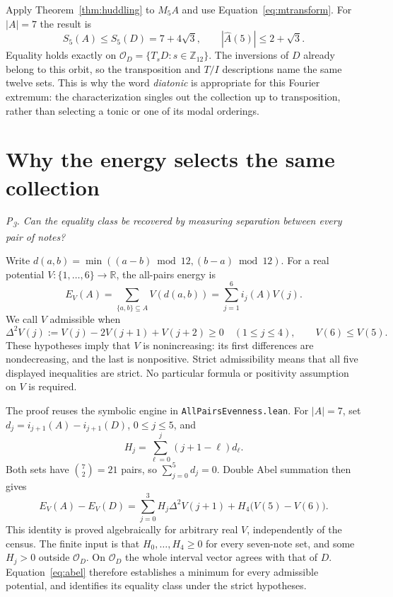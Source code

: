 \documentclass[11pt]{article}
\newcommand{\lean}[1]{\texttt{#1}}
\newcommand{\Ztwelve}{\mathbb{Z}_{12}}
\newcommand{\Ahat}{\widehat A}
\newcommand{\question}[1]{\smallskip\noindent\textit{#1}\smallskip}
\newcommand{\orb}{\mathcal O_D}
\begin{document}
Apply Theorem~\ref{thm:huddling} to $M_5A$ and use
Equation~\eqref{eq:mtransform}. For $|A|=7$ the result is
\begin{equation}\label{eq:diatonicmax}
 S_5(A)\le S_5(D)=7+4\sqrt3,
 \qquad |\Ahat(5)|\le2+\sqrt3.
\end{equation}
Equality holds exactly on
$\orb=\{T_sD:s\in\Ztwelve\}$.
The inversions of $D$ already belong to this orbit, so the transposition and $T/I$ descriptions
name the same twelve sets. This is why the word \emph{diatonic} is appropriate for this
Fourier extremum: the characterization singles out the collection up to transposition,
rather than selecting a tonic or one of its modal orderings.

\section{Why the energy selects the same collection}\label{sec:energy}

\question{P\textsubscript{3}. Can the equality class be recovered by measuring separation
between every pair of notes?}

Write $d(a,b)=\min((a-b)\bmod12,(b-a)\bmod12)$. For a real potential
$V:\{1,\ldots,6\}\to\mathbb R$, the all-pairs energy is
\begin{equation}\label{eq:energy}
 E_V(A)=\sum_{\{a,b\}\subseteq A}V(d(a,b))
       =\sum_{j=1}^{6}i_j(A)V(j).
\end{equation}
We call $V$ admissible when
\begin{equation}\label{eq:admissible}
 \Delta^2V(j):=V(j)-2V(j+1)+V(j+2)\ge0\quad(1\le j\le4),
 \qquad V(6)\le V(5).
\end{equation}
These hypotheses imply that $V$ is nonincreasing: its first differences are nondecreasing,
and the last is nonpositive. Strict admissibility means that all five displayed
inequalities are strict. No particular formula or positivity assumption on $V$ is required.

The proof reuses the symbolic engine in \lean{AllPairsEvenness.lean}.
For $|A|=7$, set $d_j=i_{j+1}(A)-i_{j+1}(D)$, $0\le j\le5$, and
\[
 H_j=\sum_{\ell=0}^{j}(j+1-\ell)d_\ell.
\]
Both sets have $\binom72=21$ pairs, so $\sum_{j=0}^5d_j=0$. Double Abel summation then gives
\begin{equation}\label{eq:abel}
 E_V(A)-E_V(D)=\sum_{j=0}^{3}H_j\Delta^2V(j+1)
                      +H_4\bigl(V(5)-V(6)\bigr).
\end{equation}
This identity is proved algebraically for arbitrary real $V$, independently of the census.
The finite input is that $H_0,\ldots,H_4\ge0$ for every seven-note set, and some $H_j>0$
outside $\orb$. On $\orb$ the whole interval vector agrees with that of $D$.
Equation~\eqref{eq:abel} therefore establishes a minimum for every admissible potential,
and identifies its equality class under the strict hypotheses.
\end{document}
